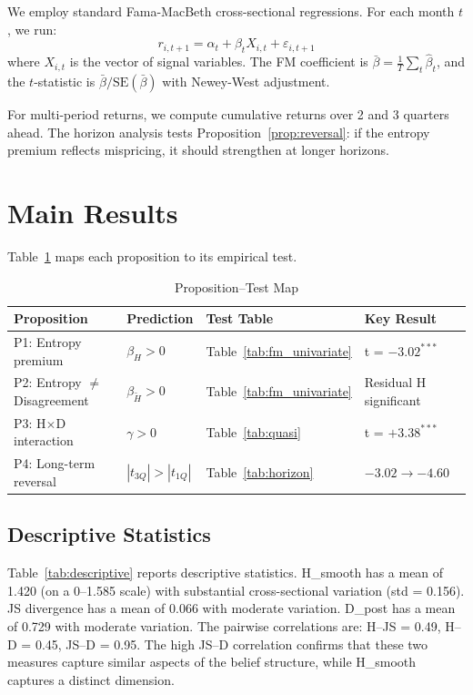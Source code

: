 \documentclass[12pt,a4paper]{article}
\begin{document}
We employ standard Fama-MacBeth cross-sectional regressions. For each month $t$, we run:
\begin{equation}
r_{i,t+1} = \alpha_t + \beta_t X_{i,t} + \varepsilon_{i,t+1}
\end{equation}
where $X_{i,t}$ is the vector of signal variables. The FM coefficient is $\bar{\beta} = \frac{1}{T}\sum_t \hat{\beta}_t$, and the $t$-statistic is $\bar{\beta} / \text{SE}(\bar{\beta})$ with Newey-West adjustment.

For multi-period returns, we compute cumulative returns over 2 and 3 quarters ahead. The horizon analysis tests Proposition~\ref{prop:reversal}: if the entropy premium reflects mispricing, it should strengthen at longer horizons.

\section{Main Results}\label{sec:results}

Table~\ref{tab:propmap} maps each proposition to its empirical test.

\begin{table}[H]
\centering
\caption{Proposition--Test Map}
\label{tab:propmap}
\small
\begin{tabular}{llll}
\toprule
Proposition & Prediction & Test Table & Key Result \\
\midrule
P1: Entropy premium & $\beta_H > 0$ & Table~\ref{tab:fm_univariate} & t = $-3.02^{***}$ \\
P2: Entropy $\neq$ Disagreement & $\beta_{\tilde{H}} > 0$ & Table~\ref{tab:fm_univariate} & Residual H significant \\
P3: H$\times$D interaction & $\gamma > 0$ & Table~\ref{tab:quasi} & t = $+3.38^{***}$ \\
P4: Long-term reversal & $|t_{3Q}| > |t_{1Q}|$ & Table~\ref{tab:horizon} & $-3.02 \to -4.60$ \\
\bottomrule
\end{tabular}
\end{table}

\subsection{Descriptive Statistics}

Table~\ref{tab:descriptive} reports descriptive statistics. H\_smooth has a mean of 1.420 (on a 0--1.585 scale) with substantial cross-sectional variation (std = 0.156). JS divergence has a mean of 0.066 with moderate variation. D\_post has a mean of 0.729 with moderate variation. The pairwise correlations are: H--JS = 0.49, H--D = 0.45, JS--D = 0.95. The high JS--D correlation confirms that these two measures capture similar aspects of the belief structure, while H\_smooth captures a distinct dimension.
\end{document}
